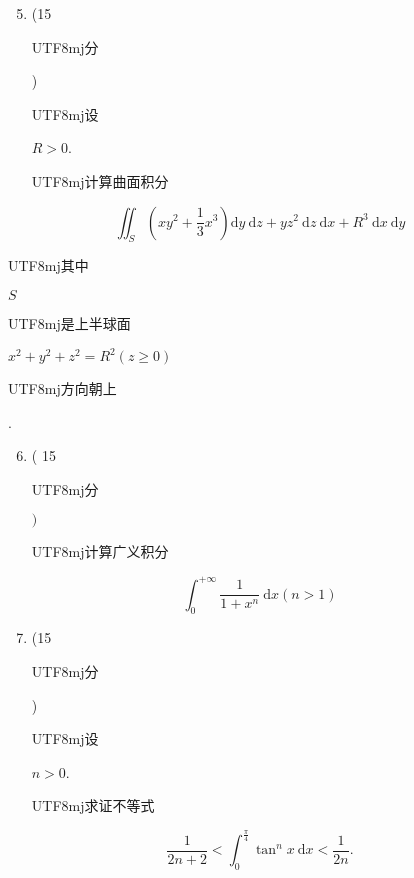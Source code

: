\documentclass[10pt]{article}
\begin{document}
\begin{enumerate}
  \setcounter{enumi}{4}
  \item (15 \begin{CJK}{UTF8}{mj}分\end{CJK}) \begin{CJK}{UTF8}{mj}设\end{CJK} $R>0$. \begin{CJK}{UTF8}{mj}计算曲面积分\end{CJK}
\end{enumerate}
$$
\iint_{S}\left(x y^{2}+\frac{1}{3} x^{3}\right) \mathrm{d} y \mathrm{~d} z+y z^{2} \mathrm{~d} z \mathrm{~d} x+R^{3} \mathrm{~d} x \mathrm{~d} y
$$
\begin{CJK}{UTF8}{mj}其中\end{CJK} $S$ \begin{CJK}{UTF8}{mj}是上半球面\end{CJK} $x^{2}+y^{2}+z^{2}=R^{2}(z \geqslant 0)$ \begin{CJK}{UTF8}{mj}方向朝上\end{CJK}.

\begin{enumerate}
  \setcounter{enumi}{5}
  \item ( 15 \begin{CJK}{UTF8}{mj}分\end{CJK} $)$ \begin{CJK}{UTF8}{mj}计算广义积分\end{CJK}
\end{enumerate}
$$
\int_{0}^{+\infty} \frac{1}{1+x^{n}} \mathrm{~d} x(n>1)
$$

\begin{enumerate}
  \setcounter{enumi}{6}
  \item (15 \begin{CJK}{UTF8}{mj}分\end{CJK}) \begin{CJK}{UTF8}{mj}设\end{CJK} $n>0$. \begin{CJK}{UTF8}{mj}求证不等式\end{CJK}
\end{enumerate}
$$
\frac{1}{2 n+2}<\int_{0}^{\frac{\pi}{4}} \tan ^{n} x \mathrm{~d} x<\frac{1}{2 n} .
$$
\end{document}
